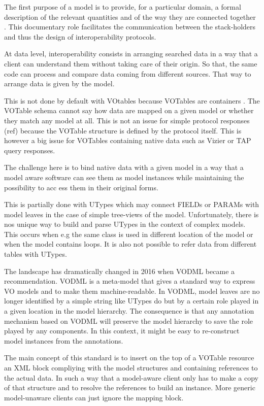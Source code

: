 The first purpose of a model is to provide,  for a particular domain, a formal description of the relevant quantities and of the way they are connected together .
This documentary role facilitates the communication between the stack-holders and thus the design of interoperability protocols. 

At data level, interoperability consists in arranging searched data in a way that a client can understand them without taking care of their origin. So that, the same code
 can process and compare data coming from different sources.  That way to arrange data is given by the model.

This is not done by default with VOtables because VOTables are containers \citep{2019ivoa.spec.1021O}. The VOTable schema cannot say how data are mapped on a given model 
or whether they match any model at all. This is not an issue for simple protocol responses (ref) because the VOTable structure is defined by the protocol itself. This is 
however a big issue for VOTables containing native data such as Vizier  or TAP query responses.

The challenge here is to bind native data with a given model in a way that a model aware software can see them as model instances while maintaining the possibility to acc
ess them in their original forms.

This is partially done with UTypes which may connect FIELDs or PARAMs with model leaves in the case of simple tree-views of the model. Unfortunately, there is nos unique 
 way to build and parse UTypes in the context of complex models. This occurs when e.g the same class is used in different location of the model or when the model contains
 loops. It is also not possible to refer data from different tables with  UTypes.

The landscape has dramatically changed in 2016 when VODML \citep{2018ivoa.spec.0910L} became a recommendation. VODML is a meta-model that gives a standard way to express 
VO models and to make them machine-readable.
In VODML, model leaves are no longer identified by a simple string like UTypes do but by a certain role played in a given location in the model hierarchy.
The consequence is that any annotation mechanism based on VODML will preserve the model hierarchy to save the role played by any components. In this context, it might be 
easy to re-construct model instances from the annotations. 

The main concept of this standard is to insert on the  top of a VOTable resource an XML block compliying with the model structures and containing references to the actual
 data.
In such a way that a model-aware client only has to make a copy of that structure and to resolve the references  to build an instance. More generic model-unaware clients 
can just ignore the mapping block. 

